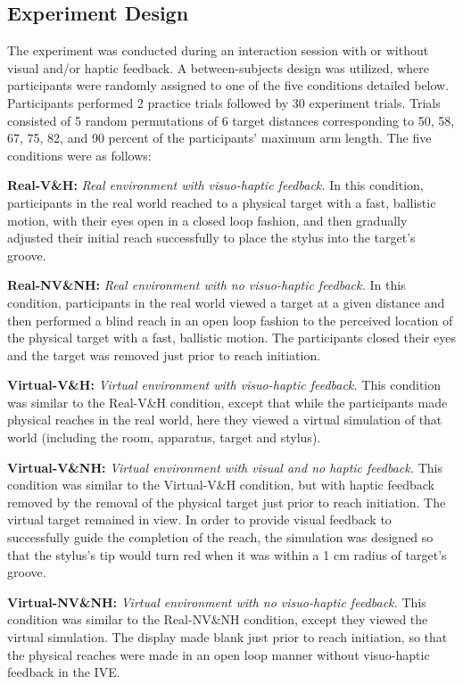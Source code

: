 \subsection{Experiment Design} \label{ExDesign}
The experiment was conducted during an interaction session with or without visual and/or haptic feedback. A between-subjects design was utilized, where participants were randomly assigned to one of the five conditions detailed below. Participants performed 2 practice trials followed by 30 experiment trials. Trials consisted of 5 random permutations of 6 target distances corresponding to 50, 58, 67, 75, 82, and 90 percent of the participants' maximum arm length. The five conditions were as follows:


\textbf{Real-V\&H:} \textit{Real environment with visuo-haptic feedback.}  In this condition, participants in the real world reached to a physical target with a fast, ballistic motion, with their eyes open in a closed loop fashion, and then gradually adjusted their initial reach successfully to place the stylus into the target's groove. 

\textbf{Real-NV\&NH:} \textit{Real environment with no visuo-haptic feedback.} In this condition, participants in the real world viewed a target at a given distance and then performed a blind reach in an open loop fashion to the perceived location of the physical target with a fast, ballistic motion. The participants closed their eyes and the target was removed just prior to reach initiation.

\textbf{Virtual-V\&H:} \textit{Virtual environment with visuo-haptic feedback.} This condition was similar to the Real-V\&H condition, except that while the participants made physical reaches in the real world, here they viewed a virtual simulation of that world (including the room, apparatus, target and stylus). 

\textbf{Virtual-V\&NH:} \textit{Virtual environment with visual and no haptic feedback.} This condition was similar to the Virtual-V\&H condition, but with haptic feedback removed by the removal of the physical target just prior to reach initiation.  The virtual target remained in view. In order to provide visual feedback to successfully guide the completion of the reach, the simulation was designed so that the stylus's tip would turn red when it was within a 1 cm radius of target's groove.

\textbf{Virtual-NV\&NH:} \textit{Virtual environment with no visuo-haptic feedback.} This condition was similar to the Real-NV\&NH condition, except they viewed the virtual simulation. The display made blank just prior to reach initiation, so that the physical reaches were made in an open loop manner without visuo-haptic feedback in the IVE.	

